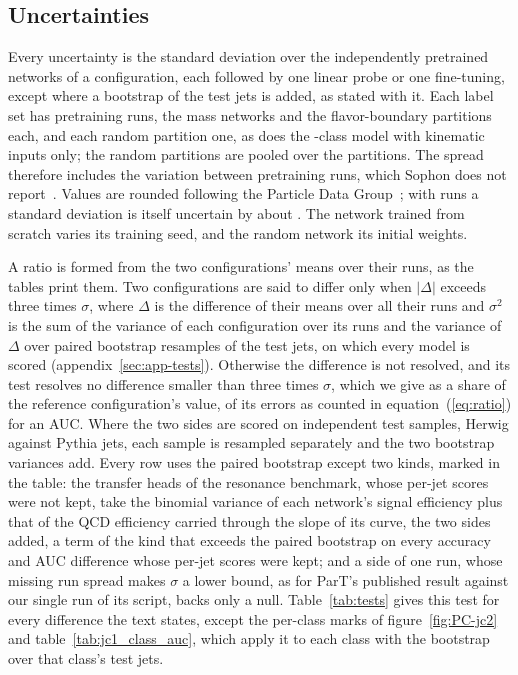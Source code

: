 \subsection{Uncertainties}\label{sec:uncertainties}

Every uncertainty is the standard deviation over the independently pretrained networks of a configuration,
each followed by one linear probe or one fine-tuning, except where a bootstrap of the test jets is added, as
stated with it. Each label set has \MlstNRunsWord{} pretraining runs, the mass networks
\MlstMassNRunsWord{} and the flavor-boundary partitions
\RandFlavRuns{} each, and each random partition one, as does the \Kfull-class model with kinematic inputs only; the random partitions are
pooled over the \RandVtwoNPartitions{} partitions. The spread therefore includes the variation between pretraining
runs, which Sophon does not report~\cite{sophon}. Values are rounded following the Particle Data
Group~\cite{pdg}; with \MlstNRunsWord{} runs a standard deviation is itself uncertain by about \MlstSdRelUnc. The
network trained from scratch varies its training seed, and the random network its initial weights.

A ratio is formed from the two configurations' means over their runs, as the tables print them. Two
configurations are said to differ only when $|\Delta|$ exceeds three times $\sigma$, where $\Delta$ is the
difference of their means over all their runs and $\sigma^2$ is the sum of the variance of each configuration
over its runs and the variance of $\Delta$ over paired bootstrap resamples of the test jets, on which every model
is scored (appendix~\ref{sec:app-tests}). Otherwise the difference is not resolved, and its test resolves no
difference smaller than three times $\sigma$, which we give as a share of the reference configuration's value, of its errors
as counted in equation~(\ref{eq:ratio}) for an AUC.
Where the two sides are scored on independent test samples, Herwig against Pythia jets, each sample is
resampled separately and the two bootstrap variances add. Every row uses the paired bootstrap except two kinds,
marked in the table: the transfer heads of the resonance benchmark, whose per-jet scores were not kept, take the
binomial variance of each network's signal efficiency plus that of the QCD efficiency carried through the slope of
its curve, the two sides added, a term of the kind that exceeds the paired bootstrap on every
accuracy and AUC difference whose per-jet scores were kept; and a side of one run, whose missing
run spread makes $\sigma$ a lower bound, as for ParT's published result against our single run of its script, backs
only a null.
Table~\ref{tab:tests} gives this test for every difference the text states, except the per-class marks of
figure~\ref{fig:PC-jc2} and table~\ref{tab:jc1_class_auc}, which apply it to each class with the bootstrap over
that class's test jets.
